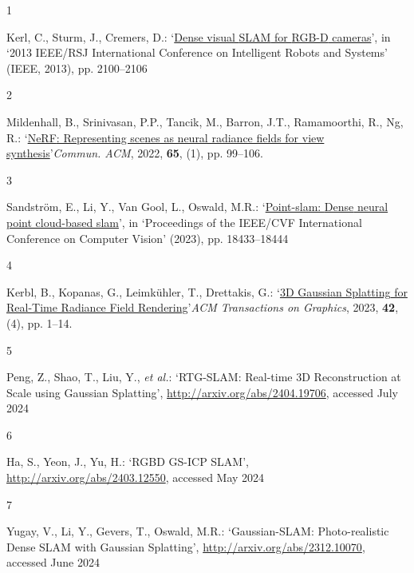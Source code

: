 \documentclass[twocolumn]{article} %
\newlength{\cslhangindent}
\newlength{\csllabelwidth}
\newenvironment{CSLReferences}[2] %
{\begin{list}{}{%
  \setlength{\itemindent}{0pt}
  \setlength{\leftmargin}{0pt}
  \setlength{\parsep}{0pt}
  \ifodd #1
  \setlength{\leftmargin}{\cslhangindent}
  \setlength{\itemindent}{-1\cslhangindent}
  \fi
  \setlength{\itemsep}{0.5\baselineskip}}}
{\end{list}}
\newcommand{\CSLLeftMargin}[1]{\parbox[t]{\csllabelwidth}{\strut#1\strut}}
\newcommand{\CSLRightInline}[1]{\parbox[t]{\linewidth - \csllabelwidth}{\strut#1\strut}}
\begin{document}
\label{refs}
\begin{CSLReferences}{0}{1}
\CSLLeftMargin{1 }%
\CSLRightInline{Kerl, C., Sturm, J., Cremers, D.:
{`\href{https://doi.org/10.1109/IROS.2013.6696650}{Dense visual {SLAM}
for {RGB-D} cameras}'}, in {`2013 {IEEE}/{RSJ International Conference}
on {Intelligent Robots} and {Systems}'} (IEEE, 2013), pp. 2100--2106}

\CSLLeftMargin{2 }%
\CSLRightInline{Mildenhall, B., Srinivasan, P.P., Tancik, M., Barron,
J.T., Ramamoorthi, R., Ng, R.:
{`\href{https://doi.org/10.1145/3503250}{{NeRF}: Representing scenes as
neural radiance fields for view synthesis}'}\emph{Commun. ACM}, 2022,
\textbf{65}, (1), pp. 99--106. }

\CSLLeftMargin{3 }%
\CSLRightInline{Sandström, E., Li, Y., Van Gool, L., Oswald, M.R.:
{`\href{http://openaccess.thecvf.com/content/ICCV2023/html/Sandstrom_Point-SLAM_Dense_Neural_Point_Cloud-based_SLAM_ICCV_2023_paper.html}{Point-slam:
{Dense} neural point cloud-based slam}'}, in {`Proceedings of the
{IEEE}/{CVF International Conference} on {Computer Vision}'} (2023), pp.
18433--18444}

\CSLLeftMargin{4 }%
\CSLRightInline{Kerbl, B., Kopanas, G., Leimkühler, T., Drettakis, G.:
{`\href{https://doi.org/10.1145/3592433}{{3D Gaussian Splatting} for
{Real-Time Radiance Field Rendering}}'}\emph{ACM Transactions on
Graphics}, 2023, \textbf{42}, (4), pp. 1--14. }

\CSLLeftMargin{5 }%
\CSLRightInline{Peng, Z., Shao, T., Liu, Y., \emph{et al.}:
{`{RTG-SLAM}: {Real-time 3D Reconstruction} at {Scale} using {Gaussian
Splatting}'}, \url{http://arxiv.org/abs/2404.19706}, accessed July 2024}

\CSLLeftMargin{6 }%
\CSLRightInline{Ha, S., Yeon, J., Yu, H.: {`{RGBD GS-ICP SLAM}'},
\url{http://arxiv.org/abs/2403.12550}, accessed May 2024}

\CSLLeftMargin{7 }%
\CSLRightInline{Yugay, V., Li, Y., Gevers, T., Oswald, M.R.:
{`Gaussian-{SLAM}: {Photo-realistic Dense SLAM} with {Gaussian
Splatting}'}, \url{http://arxiv.org/abs/2312.10070}, accessed June 2024}


\end{CSLReferences}
\end{document}
